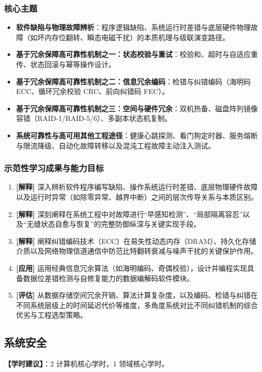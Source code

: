 \subsubsection{核心主题}
\begin{itemize}
    \item \textbf{软件缺陷与物理故障辨析}：程序逻辑缺陷、系统运行时差错与底层硬件物理故障（如坏内存位翻转、瞬态电磁干扰）的本质机理与级联演变路径。
    \item \textbf{基于冗余保障高可靠性机制之一：状态校验与重试}：校验和、超时与自适应重传、状态回滚与幂等操作设计。
    \item \textbf{基于冗余保障高可靠性机制之二：信息冗余编码}：检错与纠错编码（海明码 ECC、循环冗余校验 CRC、前向纠错码 FEC）。
    \item \textbf{基于冗余保障高可靠性机制之三：空间与硬件冗余}：双机热备、磁盘阵列镜像容错（RAID-1/RAID-5/6）、多副本状态机复制。
    \item \textbf{系统可靠性与高可用其他工程途径}：健康心跳探测、看门狗定时器、服务熔断与限流降级、自动化故障转移以及混沌工程故障主动注入测试。
\end{itemize}

\subsubsection{示范性学习成果与能力目标}
\begin{enumerate}
    \item \textbf{[解释]} 深入辨析软件程序编写缺陷、操作系统运行时差错、底层物理硬件故障以及运行时异常（如除零异常、越界中断）之间的层次传导关系与本质区别。
    \item \textbf{[解释]} 深刻阐释在系统工程中对故障进行“早感知检测”、“局部隔离容忍”以及“无缝状态自愈与恢复”的完整防御纵深与关键实现手段。
    \item \textbf{[解释]} 阐释纠错编码技术（ECC）在易失性动态内存（DRAM）、持久化存储介质以及网络物理信道通信中防范比特翻转衰减与噪声干扰的关键保护作用。
    \item \textbf{[应用]} 运用经典信息冗余算法（如海明编码、奇偶校验），设计并编程实现具备数据位差错检测与自修复能力的数据编解码软件模块。
    \item \textbf{[评估]} 从数据存储空间冗余开销、算法计算复杂度，以及编码、检错与纠错在不同系统层级上的时间延迟代价等维度，多角度系统对比不同纠错机制的综合优劣与工程选型策略。
\end{enumerate}

\subsection{系统安全}
\textbf{【学时建议】}：2 计算机核心学时，1 领域核心学时。

